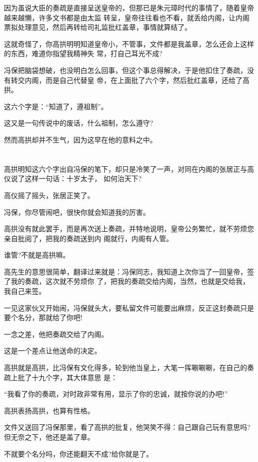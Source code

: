 \documentclass[11pt,a4paper,onecolumn]{article}
\begin{document}
因为虽说大臣的奏疏是直接呈送皇帝的，但那已是朱元璋时代的事情了，随着皇帝越来越懒，许多文书都是由太监
转呈，皇帝往往看也不看，就丢给内阁，让内阁票拟处理意见，然后再转给司礼监批红盖章，事情就算结了。

这就奇怪了，你高拱明明知道皇帝小，不管事，文件都是我盖章，怎么还会上这样的东西，难道你指望我精神失
常，打自己耳光不成?

冯保把脑袋想破，也没明白怎么回事，但这个事总得解决，于是他扣住了奏疏，没有转交内阁，而是自己代替皇
帝，在上面批了六个字，然后批红盖章，还给了高拱。

这六个字是：``知道了，遵祖制''。

这又是一句传说中的废话，什么祖制，怎么遵守?

然而高拱却并不生气，因为这早在他的意料之中。

\section[\thesection]{}

高拱明知这六个字出自冯保的笔下，却只是冷笑了一声，对同在内阁的张居正与高仪说了这样一句话：十岁太子，
如何治天下?

高仪摇了摇头，张居正笑了。

冯保，你尽管闹吧，很快你就会知道我的厉害。

高拱没有就此罢手，而是再次送上奏疏，并特地说明，皇帝公务繁忙，就不劳烦您亲自批阅了，把我的奏疏送到内
阁就行，内阁有人管。

谁管?不就是高拱嘛。

高先生的意思很简单，翻译过来就是：冯保同志，我知道上次你当了一回皇帝，签了我的奏疏，这次就不劳烦你
了，把我的奏疏交给内阁，当然，也就是交给我，我自己来签。

一见这家伙又开始闹，冯保就头大，要私留文件可能要出麻烦，反正这封奏疏只是要个名分，那就给了你吧!

一念之差，他把奏疏交给了内阁。

这是一个差点让他送命的决定。

高拱就是高拱，比冯保有文化得多，轮到他当皇上，大笔一挥唰唰唰，在自己的奏疏上批了十九个字，其大体意思
是：

``我看了你的奏疏，对时政非常有用，显示了你的忠诚，就按你说的办吧!''

高拱表扬高拱，也算有性格。

文件又送回了冯保那里，看了高拱的批复，他哭笑不得：自己跟自己玩有意思吗?但无奈之下，他还是盖了章。

不就要个名分吗，你还能翻天不成?给你就是了。
\end{document}

